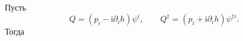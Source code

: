 \documentclass[a4paper, 14pt]{extarticle}
\begin{document}
\begin{sol}
Пусть
\[
	Q=\left( p_i-\mathrm{i} \partial_i h \right) \psi^i,
	\qquad Q^\dagger=
	\left( p_i+\mathrm{i} \partial_i h \right) \psi^{\dagger i}
.\] 
Тогда

\end{sol}
\end{document}
